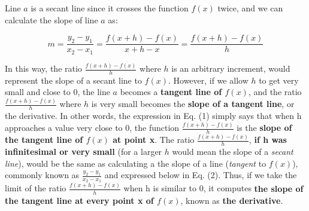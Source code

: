 \documentclass[12pt]{article}
\begin{document}
\begin{center}

\end{center}

Line $a$ is a secant line since it crosses the function $f(x)$ twice, and we can calculate the slope of line $a$ as:

\begin{equation}
    m = \frac{y_2 - y_1}{x_2 - x_1} = \frac{f(x+h) - f(x)}{x + h - x} = \frac{f(x+h) - f(x)}{h}
\end{equation}

In this way, the ratio $\frac{f(x+h) - f(x)}{h}$ where $h$ is an arbitrary increment, would represent the slope of a secant line to $f(x)$. However, if we allow $h$ to get very small and close to 0, the line $a$ becomes a \textbf{tangent line of $f(x)$}, and the ratio $\frac{f(x+h) - f(x)}{h}$ where $h$ is very small becomes the \textbf{slope of a tangent line}, or the derivative. In other words, the expression in Eq. (1) simply says that when h approaches a value very close to 0, the function $\frac{f(x+h) - f(x)}{h}$ is the \textbf{slope of the tangent line of $f(x)$ at point x}. The ratio $\frac{f(x+h) - f(x)}{h}$, \textbf{if h was infinitesimal or very small} (for a larger $h$ would mean the slope of a \textit{secant line}), would be the same as calculating a the slope of a line (\textit{tangent} to $f(x)$), commonly known as $\frac{y_2 - y_1}{x_2 - x_1}$ and expressed below in Eq. (2). Thus, if we take the limit of the ratio $\frac{f(x+h) - f(x)}{h}$ when h is similar to 0, it computes \textbf{the slope of the tangent line at every point x of $f(x)$}, known as \textbf{the derivative}.
\\
\end{document}
